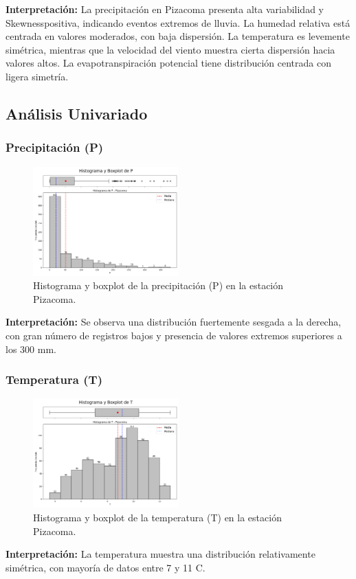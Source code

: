 \textbf{Interpretación:} La precipitación en Pizacoma presenta alta variabilidad y Skewnesspositiva, indicando eventos extremos de lluvia. La humedad relativa está centrada en valores moderados, con baja dispersión. La temperatura es levemente simétrica, mientras que la velocidad del viento muestra cierta dispersión hacia valores altos. La evapotranspiración potencial tiene distribución centrada con ligera simetría.

\subsection{Análisis Univariado}

\subsubsection*{Precipitación (P)}
\begin{figure}[H]
\centering
\includegraphics[width=0.5\textwidth]{resultados/por_estacion_meteorologica/Pizacoma/P_histograma.png}
\caption{Histograma y boxplot de la precipitación (P) en la estación Pizacoma.}
\label{fig:pizacoma_P}
\end{figure}
\textbf{Interpretación:} Se observa una distribución fuertemente sesgada a la derecha, con gran número de registros bajos y presencia de valores extremos superiores a los 300 mm.

\subsubsection*{Temperatura (T)}
\begin{figure}[H]
\centering
\includegraphics[width=0.5\textwidth]{resultados/por_estacion_meteorologica/Pizacoma/T_histograma.png}
\caption{Histograma y boxplot de la temperatura (T) en la estación Pizacoma.}
\label{fig:pizacoma_T}
\end{figure}
\textbf{Interpretación:} La temperatura muestra una distribución relativamente simétrica, con mayoría de datos entre 7 y 11 \textdegree C.

